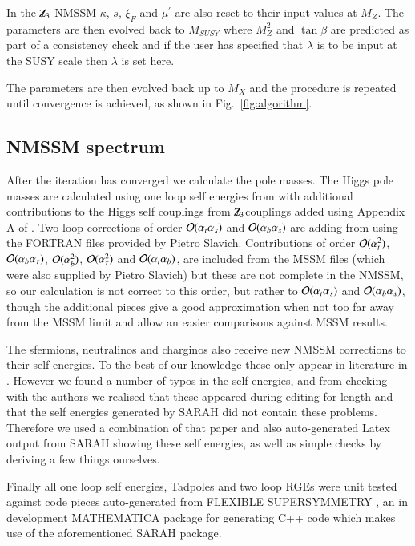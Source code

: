 \documentclass[final,3p,times,pdflatex]{elsarticle}
\newcommand{\Zv}{{\mbox{${\not\!\!Z_3}$}}}
\def\at{\alpha_t}
\def\ab{\alpha_b}
\def\as{\alpha_s}
\def\atau{\alpha_{\tau}}
\def\oatab{{\cal O}(\at\ab)}
\def\oatas{{\cal O}(\at\as)}
\def\oabas{{\cal O}(\ab\as)}
\def\oatq{{\cal O}(\at^2)}
\def\oabq{{\cal O}(\ab^2)}
\def\oatauq{{\cal O}(\atau^2)}
\def\oabatau{{\cal O}(\ab \atau)}
\begin{document}
In the \Zv-NMSSM $\kappa$, $s$, $\xi_F$ and $\mu^\prime$ are also
reset to their input values at $M_Z$.  The parameters are then evolved
back to $M_{SUSY}$ where $M_Z^2$ and $\tan\beta$ are predicted as
part of a consistency check and if the user has specified that
$\lambda$ is to be input at the SUSY scale then $\lambda$ is set here.


The parameters are then evolved back up to $M_X$ and the procedure is repeated until convergence is achieved, as shown in Fig.~\ref{fig:algorithm}. 

\subsection{NMSSM spectrum \label{spec}}
After the iteration has converged we calculate the pole masses.  The
Higgs pole masses are calculated using one loop self energies from
\cite{Degrassi:2009yq} with additional contributions to the Higgs self
couplings from \Zv couplings added using Appendix A of
\cite{Ellwanger:2009dp}.  Two loop corrections of order $\oatas$ and
$\oabas$ are adding from \cite{Degrassi:2009yq} using the FORTRAN
files provided by Pietro Slavich.  Contributions of order $\oatq$,
$\oabatau$, $\oabq$, $\oatauq$ and $\oatab$, are included from the
MSSM files (which were also supplied by Pietro Slavich) but these are
not complete in the NMSSM, so our calculation is not correct to this
order, but rather to $\oatas$ and $\oabas$, though the additional
pieces give a good approximation when not too far away from the MSSM
limit and allow an easier comparisons against MSSM results.

The sfermions, neutralinos and charginos also receive new NMSSM
corrections to their self energies. To the best of our knowledge these
only appear in literature in \cite{Staub:2010ty}.  However we found a
number of typos in the self energies, and from checking with the
authors we realised that these appeared during editing for length and
that the self energies generated by SARAH
\cite{Staub:2009bi,Staub:2010jh,Staub:2012pb,Staub:2013tta} did not
contain these problems.  Therefore we used a combination of that paper
and also auto-generated Latex output from SARAH showing these self
energies, as well as simple checks by deriving a few things ourselves.

Finally all one loop self energies, Tadpoles and two loop RGEs were unit tested against code pieces auto-generated from FLEXIBLE SUPERSYMMETRY \cite{flexi-susy}, an in development MATHEMATICA package for generating C++ code which makes use of the aforementioned SARAH package\cite{Staub:2009bi,Staub:2010jh,Staub:2012pb,Staub:2013tta}. 
\end{document}
